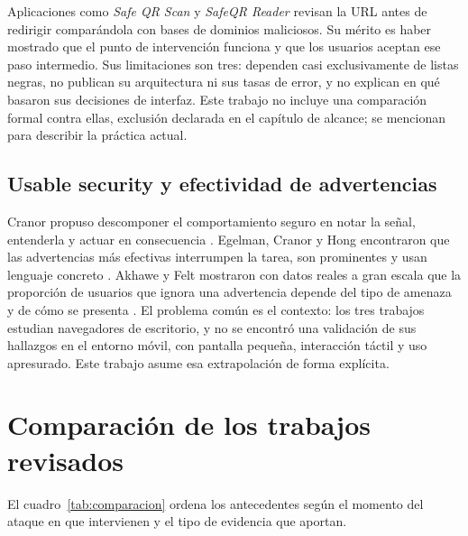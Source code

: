 Aplicaciones como \emph{Safe QR Scan} y \emph{SafeQR Reader} revisan la URL antes de redirigir comparándola con bases de dominios maliciosos. Su mérito es haber mostrado que el punto de intervención funciona y que los usuarios aceptan ese paso intermedio. Sus limitaciones son tres: dependen casi exclusivamente de listas negras, no publican su arquitectura ni sus tasas de error, y no explican en qué basaron sus decisiones de interfaz. Este trabajo no incluye una comparación formal contra ellas, exclusión declarada en el capítulo de alcance; se mencionan para describir la práctica actual.

\subsection{Usable security y efectividad de advertencias}

Cranor propuso descomponer el comportamiento seguro en notar la señal, entenderla y actuar en consecuencia \cite{cranor2008framework}. Egelman, Cranor y Hong encontraron que las advertencias más efectivas interrumpen la tarea, son prominentes y usan lenguaje concreto \cite{egelman2008warned}. Akhawe y Felt mostraron con datos reales a gran escala que la proporción de usuarios que ignora una advertencia depende del tipo de amenaza y de cómo se presenta \cite{akhawe2013alice}. El problema común es el contexto: los tres trabajos estudian navegadores de escritorio, y no se encontró una validación de sus hallazgos en el entorno móvil, con pantalla pequeña, interacción táctil y uso apresurado. Este trabajo asume esa extrapolación de forma explícita.

\section{Comparación de los trabajos revisados}

El cuadro~\ref{tab:comparacion} ordena los antecedentes según el momento del ataque en que intervienen y el tipo de evidencia que aportan.


